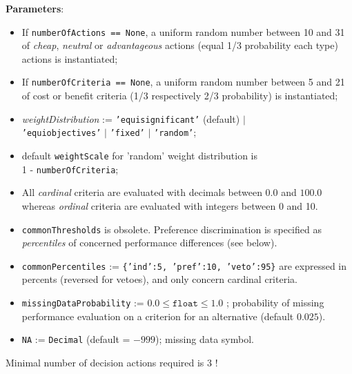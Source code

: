 \textbf{Parameters}:
\begin{itemize}[leftmargin=0.5cm,rightmargin=0.5cm]
\item If \texttt{numberOfActions == None}, a uniform random number between 10 and 31 of \emph{cheap}, \emph{neutral} or \emph{advantageous} actions (equal 1/3 probability each type) actions is instantiated;
\item If \texttt{numberOfCriteria == None}, a uniform random number between 5 and 21 of cost or benefit criteria (1/3 respectively 2/3 probability) is instantiated;
\item \emph{weightDistribution} :=  \texttt{'equisignificant'} (default) $|$\\
  \texttt{'equiobjectives'} $|$ \texttt{'fixed'} $|$ \texttt{'random'};
\item default \texttt{weightScale} for 'random' weight distribution is\\ 1 - \texttt{numberOfCriteria};
\item All \emph{cardinal} criteria are evaluated with decimals between $0.0$ and $100.0$ whereas \emph{ordinal} criteria are evaluated with integers between 0 and 10.
\item \texttt{commonThresholds} is obsolete. Preference discrimination is specified as \emph{percentiles} of concerned performance differences (see below).
\item \texttt{commonPercentiles} := \texttt{\{'ind':5, 'pref':10, 'veto':95\}} are expressed in percents (reversed for vetoes), and only concern cardinal criteria.
\item \texttt{missingDataProbability} := $0.0 \leq \mathtt{float} \leq 1.0$ ; probability of missing performance evaluation on a criterion for an alternative (default $0.025$).
\item \texttt{NA} := \texttt{Decimal} (default = $-999$); missing data symbol. 
\end{itemize}

Minimal number of decision actions required is 3 ! 

